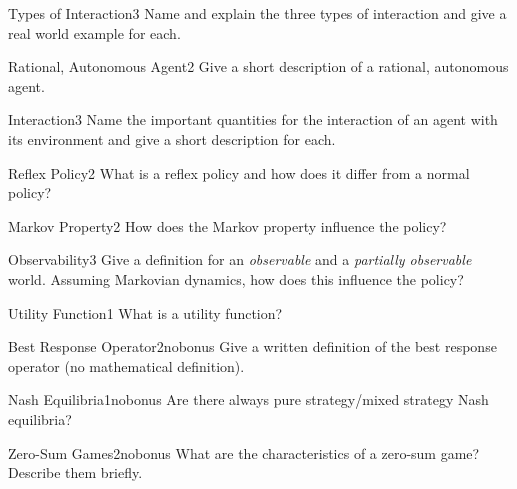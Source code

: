 \documentclass[twoside,english,colorbacktitle,accentcolor=tud9c,10pt]{tudexercise}
\begin{document}
\begin{questions}

\begin{question}{Types of Interaction}{3}{}
	Name and explain the three types of interaction and give a real world example for each.

\end{question}

\begin{question}{Rational, Autonomous Agent}{2}{}
	Give a short description of a rational, autonomous agent.
\end{question}

\begin{question}{Interaction}{3}{}
	Name the important quantities for the interaction of an agent with its environment and give a short description for each.
\end{question}

\begin{question}{Reflex Policy}{2}{}
	What is a reflex policy and how does it differ from a normal policy?
\end{question}

\begin{question}{Markov Property}{2}{}
	How does the Markov property influence the policy?
\end{question}

\begin{question}{Observability}{3}{}
	Give a definition for an \emph{observable} and a \emph{partially observable} world. Assuming Markovian dynamics, how does this influence the policy?
\end{question}

\begin{question}{Utility Function}{1}{}
	What is a utility function?
\end{question}

\begin{question}{Best Response Operator}{2}{nobonus}
	Give a written definition of the best response operator (no mathematical definition).
\end{question}

\begin{question}{Nash Equilibria}{1}{nobonus}
	Are there always pure strategy/mixed strategy Nash equilibria? 
\end{question}

\begin{question}{Zero-Sum Games}{2}{nobonus}
	What are the characteristics of a zero-sum game? Describe them briefly.
\end{question}

\end{questions}
\end{document}
